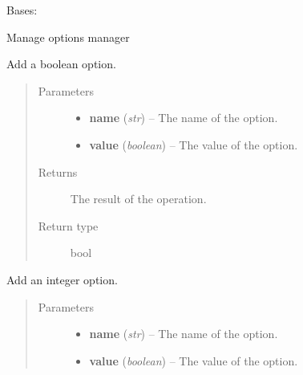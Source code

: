\documentclass[letterpaper,10pt,english]{sphinxmanual}
\begin{document}
\begin{fulllineitems}
\label{libopenzwave:libopenzwave.PyOptions}
Bases: 

Manage options manager

\begin{fulllineitems}
\label{libopenzwave:libopenzwave.PyOptions.addOptionBool}
Add a boolean option.
\begin{quote}\begin{description}
\item[{Parameters}] \leavevmode\begin{itemize}
\item {} 
\textbf{name} (\emph{str}) -- The name of the option.

\item {} 
\textbf{value} (\emph{boolean}) -- The value of the option.

\end{itemize}

\item[{Returns}] \leavevmode
The result of the operation.

\item[{Return type}] \leavevmode
bool

\end{description}\end{quote}

\end{fulllineitems}


\begin{fulllineitems}
\label{libopenzwave:libopenzwave.PyOptions.addOptionInt}
Add an integer option.
\begin{quote}\begin{description}
\item[{Parameters}] \leavevmode\begin{itemize}
\item {} 
\textbf{name} (\emph{str}) -- The name of the option.

\item {} 
\textbf{value} (\emph{boolean}) -- The value of the option.

\end{itemize}


\end{description}
\end{quote}
\end{fulllineitems}
\end{fulllineitems}
\end{document}
